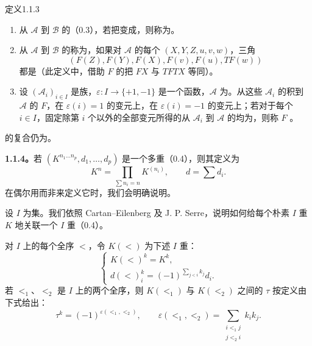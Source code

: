 \begin{SGAresult}{定义}{1.1.3}
\begin{enumerate}
\item[(i)] 从 $\mathcal A$ 到 $\mathcal B$ 的（0.3），若把变成，则称为。
\item[(ii)] 从 $\mathcal A$ 到 $\mathcal B$ 的称为，如果对 $\mathcal A$ 的每个 $(X,Y,Z,u,v,w)$，三角
\[
(F(Z),F(Y),F(X),F(v),F(u),TF(w))
\]
都是（此定义中，借助 $F$ 的把 $FX$ 与 $TFTX$ 等同）。
\item[(iii)] 设 $(\mathcal A_i)_{i\in I}$ 是族，$\varepsilon:I\to\{+1,-1\}$ 是一个函数，$\mathcal A$ 为。从这些 $\mathcal A_i$ 的积到 $\mathcal A$ 的 $F$，在 $\varepsilon(i)=1$ 的变元上，在 $\varepsilon(i)=-1$ 的变元上；若对于每个 $i\in I$，固定除第 $i$ 个以外的全部变元所得的从 $\mathcal A_i$ 到 $\mathcal A$ 的均为，则称 $F$ 。
\end{enumerate}
\end{SGAresult}
的复合仍为。

\textbf{1.1.4。}若 $(K^{n_1\dots n_p},d_1,\dots,d_p)$ 是一个多重（0.4），则其定义为
\[
K^n=\prod_{\sum n_i=n}K^{(n_i)},\qquad d=\sum d_i.\tag{1.1.4.0}
\]
在偶尔用而非来定义它时，我们会明确说明。

设 $I$ 为集。我们依照 Cartan--Eilenberg 及 J. P. Serre，说明如何给每个朴素 $I$ 重 $K$ 地关联一个 $I$ 重（0.4）。

对 $I$ 上的每个全序 $<$，令 $K(<)$ 为下述 $I$ 重：
\[
\begin{cases}
K(<)^k=K^k,\\
d(<)_i^k=(-1)^{\sum_{j<i}k_j}d_i.
\end{cases}\tag{1.1.4.1}
\]
若 $<_1$、$<_2$ 是 $I$ 上的两个全序，则 $K(<_1)$ 与 $K(<_2)$ 之间的 $\tau$ 按定义由下式给出：
\[
\tau^k=(-1)^{\varepsilon(<_1,<_2)},\qquad
\varepsilon(<_1,<_2)=\sum_{\substack{i<_1j\\j<_2i}}k_i k_j.\tag{1.1.4.2}
\]

